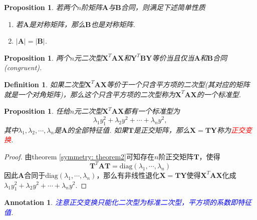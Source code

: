 \documentclass{article}
\newtheorem{proposition}[theorem]{Proposition}
\newtheorem{definition}[theorem]{Definition}
\newtheorem{annotation}[theorem]{Annotation}
\newcommand{\mbf}[1]{\bm{#1}}
\newcommand{\redt}[1]{\textcolor{red}{#1}}
\newcommand{\bluet}[1]{\textcolor{blue}{#1}}
\begin{document}
\begin{proposition}
\rm 若两个$n$阶矩阵$\mbf{A}$与$\mbf{B}$合同，则满足下述简单性质
\begin{enumerate}
	\item 若$\mbf{A}$是对称矩阵，那么$\mbf{B}$也是对称矩阵. 
	\item $|\mbf{A}| = |\mbf{B}|$. 
\end{enumerate}
\end{proposition}


\begin{proposition}
\rm 两个$n$元二次型$\mbf{X}^T\mbf{A}\mbf{X}$和$\mbf{Y}^T\mbf{B}\mbf{Y}$等价当且仅当$\mbf{A}$和$\mbf{B}$合同(congruent).
\end{proposition}

\begin{definition}
\rm 如果二次型$\mbf{X}^T\mbf{A}\mbf{X}$等价于一个只含平方项的二次型(其对应的矩阵就是一个对角矩阵)，那么这个只含平方项的二次型称为$\mbf{X}^T\mbf{A}\mbf{X}$的一个{\color{red}标准型}.
\end{definition}

\begin{proposition}
\rm 任给$n$元二次型$\mbf{X}^T\mbf{A}\mbf{X}$都有一个标准型为
$$
\lambda_1y_1^2 + \lambda_2y^2 + \cdots + \lambda_n y^2,
$$
其中$\lambda_1,\lambda_2,\cdots,\lambda_n$是$\mbf{A}$的全部特征值. 如果$\mbf{T}$是正交矩阵，那么$\mbf{X} = \mbf{T}\mbf{Y}$称为\redt{正交变换}.
\end{proposition}

\begin{proof}
由theorem \ref{symmetry: theorem2}可知存在$n$阶正交矩阵$\mbf{T}$，使得
$$
\mbf{T}^T\mbf{A}\mbf{T} = \text{diag}(\lambda_1,\cdots,\lambda_n)
$$
因此$\mbf{A}$合同于$\text{diag}(\lambda_1,\cdots,\lambda_n)$，那么有非线性退化$\mbf{X} = \mbf{T}\mbf{Y}$使得$\mbf{X}^T\mbf{A}\mbf{X}$化成$\lambda_1y_1^2 + \lambda_2y^2 + \cdots + \lambda_n y^2$. 
\end{proof}

\begin{annotation}
\rm  \bluet{注意正交变换只能化二次型为标准二次型，平方项的系数即特征值}.
\end{annotation}
\end{document}
